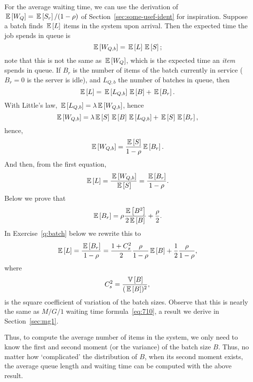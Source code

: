 For the average waiting time, we can use the derivation of
$\,\mathbb{E}\left[W_Q\right]=\,\mathbb{E}\left[S_r\right]/(1-\rho)$ of Section~\ref{sec:some-usef-ident} for
inspiration. Suppose a batch finds $\,\mathbb{E}\left[L\right]$ items in the system upon
arrival. Then the expected time the job spends in queue is
\begin{equation*}
  \,\mathbb{E}\left[W_{Q,b}\right] = \,\mathbb{E}\left[L\right] \,\mathbb{E}\left[S\right];
\end{equation*}
  note that this is not the same as
$\,\mathbb{E}\left[W_Q\right]$, which is the expected time an \emph{item} spends in queue.
If $B_r$ is the number of items of the batch currently in service
($B_r=0$ is the server is idle), and $L_{Q,b}$ the number of batches
in queue, then
\begin{equation*}
  \,\mathbb{E}\left[L\right] = \,\mathbb{E}\left[L_{Q,b}\right]\,\mathbb{E}\left[B\right] + \,\mathbb{E}\left[B_r\right].
\end{equation*}
With  Little's law, $\,\mathbb{E}\left[L_{Q,b}\right] = \lambda \,\mathbb{E}\left[W_{Q,b}\right]$, hence
\begin{equation*}
  \,\mathbb{E}\left[W_{Q,b}\right] = \lambda \,\mathbb{E}\left[S\right] \,\mathbb{E}\left[B\right] \,\mathbb{E}\left[L_{Q,b}\right] + \,\mathbb{E}\left[S\right] \,\mathbb{E}\left[B_r\right],
\end{equation*}
hence,
\begin{equation*}
  \,\mathbb{E}\left[W_{Q,b}\right] = \frac{\,\mathbb{E}\left[S\right]}{1-\rho}\,\mathbb{E}\left[B_r\right].
\end{equation*}
And then, from the first equation, 
\begin{equation*}
  \,\mathbb{E}\left[L\right] = \frac{\,\mathbb{E}\left[W_{Q,b}\right]}{\,\mathbb{E}\left[S\right]} = \frac{\,\mathbb{E}\left[B_r\right]}{1-\rho}.
\end{equation*}
Below we prove that 
\begin{equation}\label{eq:br}
  \,\mathbb{E}\left[B_r\right] = \rho\frac{\,\mathbb{E}\left[B^2\right]}{2\,\mathbb{E}\left[B\right]} + \frac\rho2.
\end{equation}
In Exercise~\ref{q:batch} below we rewrite this to
\begin{equation}\label{eq:43}
\,\mathbb{E}\left[L\right]  = \frac{\,\mathbb{E}\left[B_r\right]}{1-\rho} = \frac{1+C_s^2}2 \frac{\rho}{1-\rho} \,\mathbb{E}\left[B\right] + \frac12\frac\rho{1-\rho},
\end{equation}
where
\begin{equation*}
C_s^2 = \frac{\,\mathbb{V}\left[B\right]}{(\,\mathbb{E}\left[B\right])^2},
\end{equation*}
is the square coefficient of variation of the batch sizes.  Observe
that this is nearly the same as $M/G/1$ waiting time
formula~\ref{eq:710}, a result we derive in Section~\ref{sec:mg1}. 

Thus, to compute the average number of items in the system, we only
need to know the first and second moment (or the variance) of the
batch size $B$. Thus, no matter how `complicated' the distribution of
$B$, when its second moment exists, the average queue length and
waiting time can be computed with the above result. 



